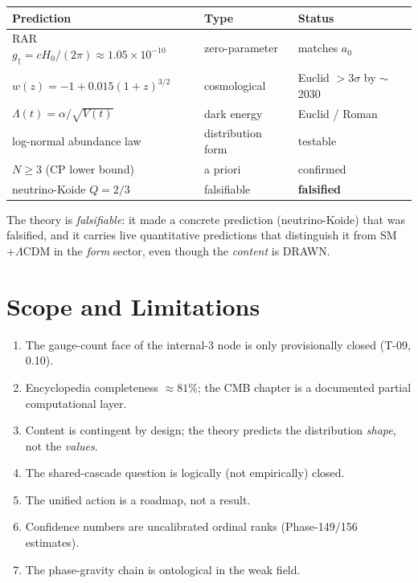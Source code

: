 \documentclass[11pt,twoside]{book}
\begin{document}
\begin{center}
\begin{tabular}{lll}
\toprule
Prediction & Type & Status \\
\midrule
RAR $g_\dagger=cH_0/(2\pi)\approx1.05\times10^{-10}$ & zero-parameter & matches $a_0$ \\
$w(z)=-1+0.015(1+z)^{3/2}$ & cosmological & Euclid $>3\sigma$ by $\sim$2030 \\
$\Lambda(t)=\alpha/\sqrt{V(t)}$ & dark energy & Euclid / Roman \\
log-normal abundance law & distribution form & testable \\
$N\ge3$ (CP lower bound) & a priori & confirmed \\
neutrino-Koide $Q=2/3$ & falsifiable & \textbf{falsified} \\
\bottomrule
\end{tabular}
\end{center}

The theory is \emph{falsifiable}: it made a concrete prediction (neutrino-Koide) that was
falsified, and it carries live quantitative predictions that distinguish it from SM
$+\Lambda$CDM in the \emph{form} sector, even though the \emph{content} is DRAWN.


\chapter{Scope and Limitations}
\label{ch:scope}

\begin{enumerate}
\item The gauge-count face of the internal-3 node is only provisionally closed (T-09, 0.10).
\item Encyclopedia completeness $\approx81\%$; the CMB chapter is a documented partial
computational layer.
\item Content is contingent by design; the theory predicts the distribution \emph{shape},
not the \emph{values}.
\item The shared-cascade question is logically (not empirically) closed.
\item The unified action is a roadmap, not a result.
\item Confidence numbers are uncalibrated ordinal ranks (Phase-149/156 estimates).
\item The phase-gravity chain is ontological in the weak field.
\end{enumerate}
\end{document}
